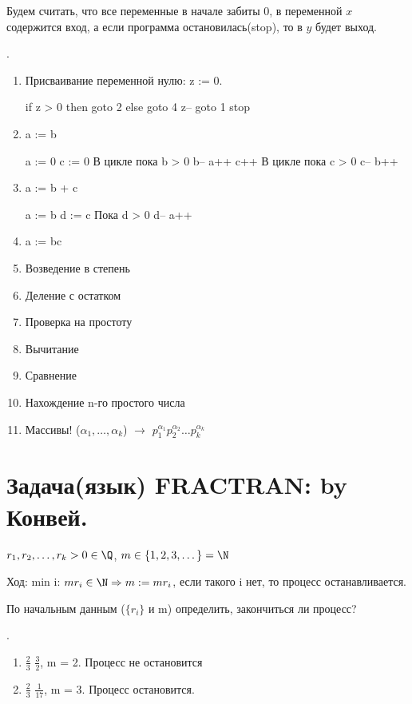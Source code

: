 Будем считать, что все переменные в начале забиты 0, в переменной $x$ содержится вход, а если программа остановилась(stop), то
в $y$ будет выход.

\begin{exmp} .\\
	\begin{enumerate}
		\item Присваивание переменной нулю: z := 0.
		\begin{listing}[1]{1}
if z > 0 then goto 2 else goto 4
z--
goto 1
stop    \end{listing}
		\item a := b
		\begin{listing}[1]{1}
a := 0
c := 0
В цикле пока b > 0
	b--
	a++
	c++
В цикле пока c > 0
	c--
	b++ \end{listing}
	\item a := b + c
	\begin{listing}[1]{1}
a := b
d := c
Пока d > 0
	d--
	a++ 
	\end{listing}
	\item a := bc
	\item Возведение в степень
	\item Деление с остатком
	\item Проверка на простоту
	\item Вычитание
	\item Сравнение
	\item Нахождение n-го простого числа
	\item Массивы! ($\alpha_1, \dots, \alpha_k$) $\rightarrow$ $p_1^{\alpha_1}p_2^{\alpha_2}\dots p_k^{\alpha_k}$
	\end{enumerate}
\end{exmp} 


\section{Задача(язык) FRACTRAN: by Конвей.} 

$r_1, r_2, \dots, r_k > 0 \in \Q$, $m \in \{1, 2, 3, \dots\} = \N$

Ход: min i: $m{r_i} \in \N \Rightarrow m := mr_i$, если такого i нет, то процесс останавливается.

По начальным данным ($\{r_i\}$ и m) определить, закончиться ли процесс?

\begin{exmp} .\\ 
	\begin{enumerate}
		\item $\frac{2}{3}$ $\frac{3}{2}$, m = 2. Процесс не остановится
		\item $\frac{2}{3}$ $\frac{1}{17}$, m = 3. Процесс остановится.
	\end{enumerate}
\end{exmp}

